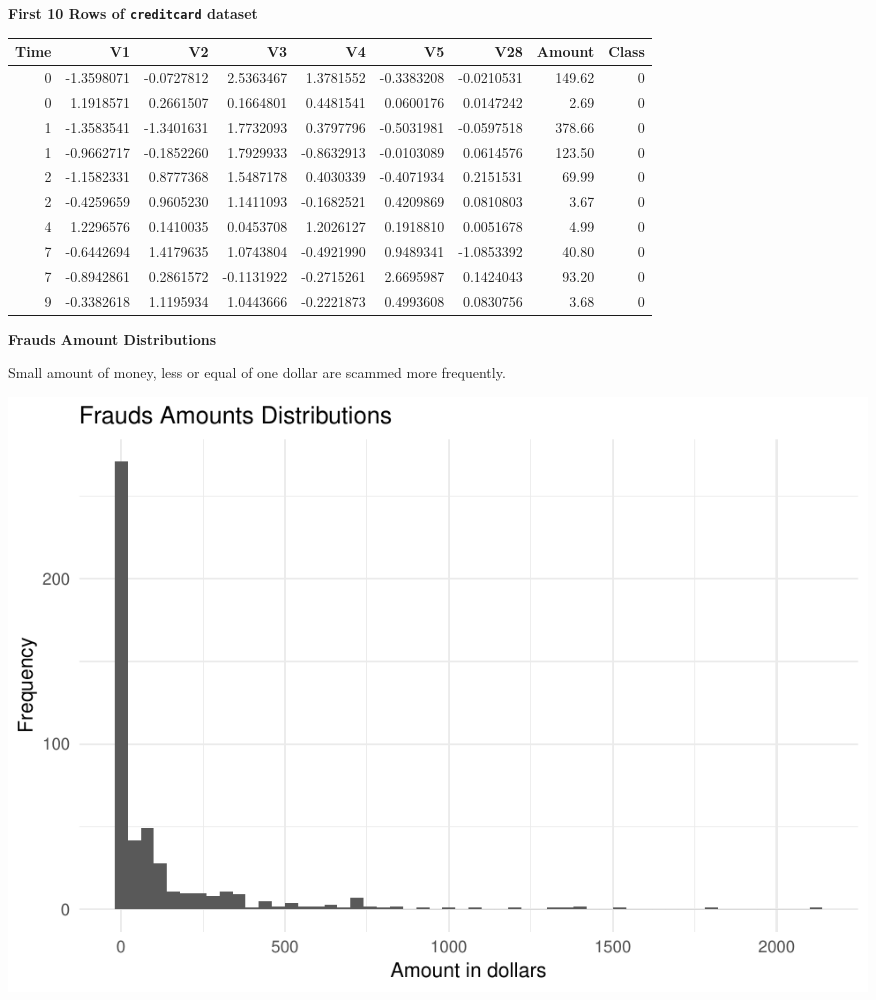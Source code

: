 \documentclass[]{article}
\begin{document}
\textbf{First 10 Rows of \texttt{creditcard} dataset}

\begin{table}[H]
\centering\begingroup\fontsize{10}{12}\selectfont

\begin{tabular}{r|r|r|r|r|r|r|r|r}
\hline
Time & V1 & V2 & V3 & V4 & V5 & V28 & Amount & Class\\
\hline
0 & -1.3598071 & -0.0727812 & 2.5363467 & 1.3781552 & -0.3383208 & -0.0210531 & 149.62 & 0\\
\hline
0 & 1.1918571 & 0.2661507 & 0.1664801 & 0.4481541 & 0.0600176 & 0.0147242 & 2.69 & 0\\
\hline
1 & -1.3583541 & -1.3401631 & 1.7732093 & 0.3797796 & -0.5031981 & -0.0597518 & 378.66 & 0\\
\hline
1 & -0.9662717 & -0.1852260 & 1.7929933 & -0.8632913 & -0.0103089 & 0.0614576 & 123.50 & 0\\
\hline
2 & -1.1582331 & 0.8777368 & 1.5487178 & 0.4030339 & -0.4071934 & 0.2151531 & 69.99 & 0\\
\hline
2 & -0.4259659 & 0.9605230 & 1.1411093 & -0.1682521 & 0.4209869 & 0.0810803 & 3.67 & 0\\
\hline
4 & 1.2296576 & 0.1410035 & 0.0453708 & 1.2026127 & 0.1918810 & 0.0051678 & 4.99 & 0\\
\hline
7 & -0.6442694 & 1.4179635 & 1.0743804 & -0.4921990 & 0.9489341 & -1.0853392 & 40.80 & 0\\
\hline
7 & -0.8942861 & 0.2861572 & -0.1131922 & -0.2715261 & 2.6695987 & 0.1424043 & 93.20 & 0\\
\hline
9 & -0.3382618 & 1.1195934 & 1.0443666 & -0.2221873 & 0.4993608 & 0.0830756 & 3.68 & 0\\
\hline
\end{tabular}
\endgroup{}
\end{table}
\newpage

\textbf{Frauds Amount Distributions}

Small amount of money, less or equal of one dollar are scammed more
frequently.

\begin{center}\includegraphics{Credit_Card_Fraud_Detection_Project_Report_files/figure-latex/unnamed-chunk-10-1} \end{center}
\end{document}
